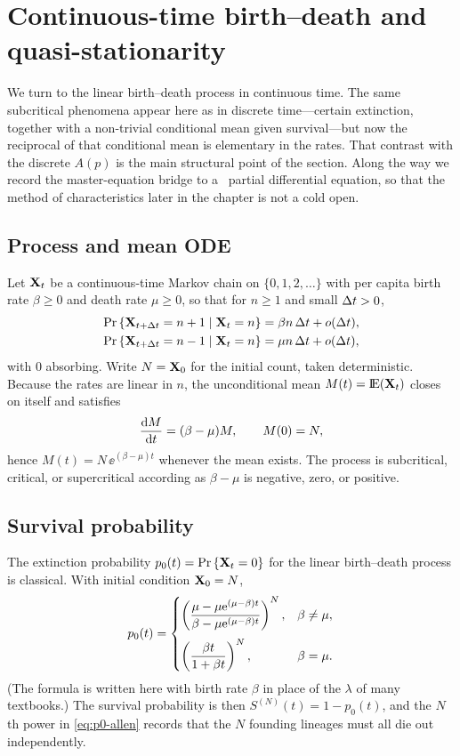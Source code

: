 \section{Continuous-time birth--death and quasi-stationarity}
\label{sec:continuous-bd}

We turn to the linear birth--death process in continuous time. The same subcritical phenomena appear here as in discrete time---certain extinction, together with a non-trivial conditional mean given survival---but now the reciprocal of that conditional mean is elementary in the rates. That contrast with the discrete $A(p)$ is the main structural point of the section. Along the way we record the master-equation bridge to a \pgf\ partial differential equation, so that the method of characteristics later in the chapter is not a cold open.

\subsection{Process and mean ODE}
\label{sec:ct-bd-def}

Let ${{\bf X}_t}$ be a continuous-time Markov chain on $\{0,1,2,\ldots\}$ with per capita birth rate $\beta\geq 0$ and death rate $\mu\geq 0$, so that for $n\geq 1$ and small $\Delta t>0$,
\begin{align*}
{\text{Pr}\left\{{\bf X}_{t+\Delta t}=n+1\mid {{\bf X}_t}=n\right\}}
&=
\beta n\,\Delta t + o(\Delta t),
\\
{\text{Pr}\left\{{\bf X}_{t+\Delta t}=n-1\mid {{\bf X}_t}=n\right\}}
&=
\mu n\,\Delta t + o(\Delta t),
\end{align*}
with $0$ absorbing. Write $N={\bf X}_0$ for the initial count, taken deterministic. Because the rates are linear in $n$, the unconditional mean $M(t)={\rm I}\!{\rm E}({{\bf X}_t})$ closes on itself and satisfies
\begin{equation}
\label{eq:mean-ode}
\displaystyle\frac{{\rm d} M}{{\rm d} t}
=
(\beta-\mu)M,
\qquad
M(0)=N,
\end{equation}
hence $M(t)=N\,\ee^{(\beta-\mu)t}$ whenever the mean exists. The process is subcritical, critical, or supercritical according as $\beta-\mu$ is negative, zero, or positive.

\subsection{Survival probability}
\label{sec:ct-survival}

The extinction probability $p_0(t)={\text{Pr}\left\{{{\bf X}_t}=0\right\}}$ for the linear birth--death process is classical. With initial condition ${\bf X}_0=N$,
\begin{equation}
\label{eq:p0-allen}
p_0(t)
=
\begin{cases}
\displaystyle
\left(\frac{\mu - \mu {\rm e}^{(\mu - \beta) t }}{  \beta  - \mu {\rm e}^{(\mu - \beta) t }}\right)^N,
&
\beta \neq \mu,
\\[1.2em]
\displaystyle
\left(\frac{\beta t}{1 + \beta t}\right)^N,
&
\beta = \mu.
\end{cases}
\end{equation}
(The formula is written here with birth rate $\beta$ in place of the $\lambda$ of many textbooks.) The survival probability is then $S^{(N)}(t)=1-p_0(t)$, and the $N$th power in \eqref{eq:p0-allen} records that the $N$ founding lineages must all die out independently.


